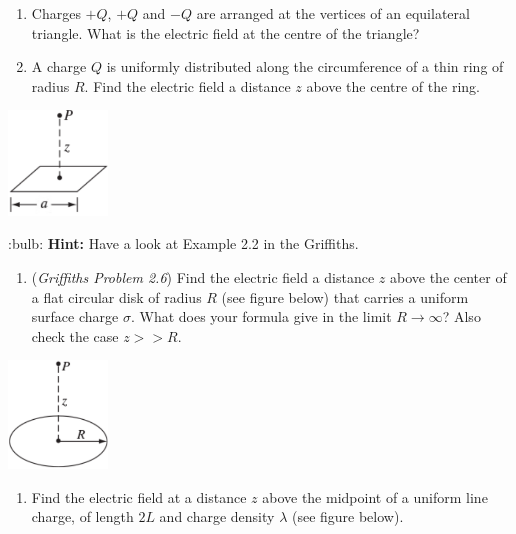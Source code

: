 \documentclass[
  letterpaper,
  DIV=11,
  numbers=noendperiod]{scrreprt}
\providecommand{\tightlist}{%
  \setlength{\itemsep}{0pt}\setlength{\parskip}{0pt}}\usepackage{longtable,booktabs,array}
\begin{document}
\begin{enumerate}
\def\labelenumi{\arabic{enumi})}
\setcounter{enumi}{1}
\item
  Charges \(+Q\), \(+Q\) and \(-Q\) are arranged at the vertices of an
  equilateral triangle. What is the electric field at the centre of the
  triangle?
\item
  A charge \(Q\) is uniformly distributed along the circumference of a
  thin ring of radius \(R\). Find the electric field a distance \(z\)
  above the centre of the ring.
\end{enumerate}

\includegraphics[width=1.04167in,height=\textheight]{Figures/L1_prob3.png}

:bulb: \textbf{Hint:} Have a look at Example 2.2 in the Griffiths.

\begin{enumerate}
\def\labelenumi{\arabic{enumi})}
\setcounter{enumi}{3}
\tightlist
\item
  (\emph{Griffiths Problem 2.6}) Find the electric field a distance
  \(z\) above the center of a flat circular disk of radius \(R\) (see
  figure below) that carries a uniform surface charge \(\sigma\). What
  does your formula give in the limit \(R \rightarrow \infty\)? Also
  check the case \(z >> R\).
\end{enumerate}

\includegraphics[width=1.04167in,height=\textheight]{Figures/L1_prob4.png}

\begin{enumerate}
\def\labelenumi{\arabic{enumi})}
\setcounter{enumi}{4}
\tightlist
\item
  Find the electric field at a distance \(z\) above the midpoint of a
  uniform line charge, of length \(2L\) and charge density \(\lambda\)
  (see figure below).
\end{enumerate}
\end{document}
